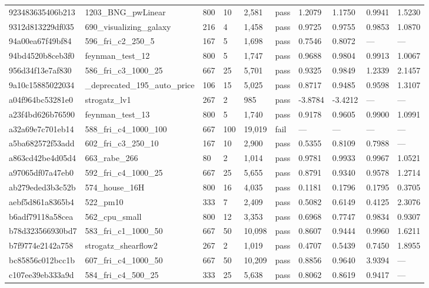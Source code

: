 \begin{longtable}{llllllllll}
923483635406b213 & 1203\_BNG\_pwLinear & 800 & 10 & 2,581 & pass & 1.2079 & 1.1750 & 0.9941 & 1.5230\\
9312d813229df035 & 690\_visualizing\_galaxy & 216 & 4 & 1,458 & pass & 0.9725 & 0.9755 & 0.9853 & 1.0870\\
94a00ea67f49bf84 & 596\_fri\_c2\_250\_5 & 167 & 5 & 1,698 & pass & 0.7546 & 0.8072 & --- & ---\\
94bd4520b8ceb3f0 & feynman\_test\_12 & 800 & 5 & 1,747 & pass & 0.9688 & 0.9804 & 0.9913 & 1.0067\\
956d34f13e7af830 & 586\_fri\_c3\_1000\_25 & 667 & 25 & 5,701 & pass & 0.9325 & 0.9849 & 1.2339 & 2.1457\\
9a10c15885022034 & \_deprecated\_195\_auto\_price & 106 & 15 & 5,025 & pass & 0.8717 & 0.9485 & 0.9598 & 1.3107\\
a04f964bc53281e0 & strogatz\_lv1 & 267 & 2 & 985 & pass & -3.8784 & -3.4212 & --- & ---\\
a23f4bd626b76590 & feynman\_test\_13 & 800 & 5 & 1,740 & pass & 0.9178 & 0.9605 & 0.9900 & 1.0991\\
a32a69e7c701eb14 & 588\_fri\_c4\_1000\_100 & 667 & 100 & 19,019 & fail & --- & --- & --- & ---\\
a5ba682572f53add & 602\_fri\_c3\_250\_10 & 167 & 10 & 2,900 & pass & 0.5355 & 0.8109 & 0.7988 & ---\\
a863cd42be4d05d4 & 663\_rabe\_266 & 80 & 2 & 1,014 & pass & 0.9781 & 0.9933 & 0.9967 & 1.0521\\
a97065df07a47eb0 & 592\_fri\_c4\_1000\_25 & 667 & 25 & 5,655 & pass & 0.8791 & 0.9340 & 0.9578 & 1.2714\\
ab279eded3b3c52b & 574\_house\_16H & 800 & 16 & 4,035 & pass & 0.1181 & 0.1796 & 0.1795 & 0.3705\\
aebf5d861a8365b4 & 522\_pm10 & 333 & 7 & 2,409 & pass & 0.5082 & 0.6149 & 0.4125 & 2.3076\\
b6adf79118a58cea & 562\_cpu\_small & 800 & 12 & 3,353 & pass & 0.6968 & 0.7747 & 0.9834 & 0.9307\\
b78d323566930bd7 & 583\_fri\_c1\_1000\_50 & 667 & 50 & 10,098 & pass & 0.8607 & 0.9444 & 0.9960 & 1.6211\\
b7f9774e2142a758 & strogatz\_shearflow2 & 267 & 2 & 1,019 & pass & 0.4707 & 0.5439 & 0.7450 & 1.8955\\
bc85856c012bcc1b & 607\_fri\_c4\_1000\_50 & 667 & 50 & 10,209 & pass & 0.8856 & 0.9640 & 3.9394 & ---\\
c107ee39eb333a9d & 584\_fri\_c4\_500\_25 & 333 & 25 & 5,638 & pass & 0.8062 & 0.8619 & 0.9417 & ---\\

\end{longtable}
